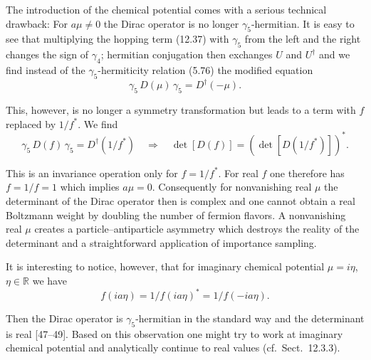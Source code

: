 The introduction of the chemical potential comes with a serious technical
drawback: For $a\mu \ne 0$ the Dirac operator is no longer
$\gamma_5$-hermitian. It is easy to see that multiplying the hopping term
(12.37) with $\gamma_5$ from the left and the right changes the sign of
$\gamma_4$; hermitian conjugation then exchanges $U$ and $U^\dagger$ and we
find instead of the $\gamma_5$-hermiticity relation (5.76) the modified
equation
\begin{equation}
  \gamma_5\,D(\mu)\,\gamma_5 = D^\dagger(-\mu).
\end{equation}

This, however, is no longer a symmetry transformation but leads to a term with
$f$ replaced by $1/f^*$. We find
\begin{equation}
  \gamma_5\,D(f)\,\gamma_5 = D^\dagger(1/f^*)
  \quad\Rightarrow\quad
  \det[D(f)] = \left(\det[D(1/f^*)]\right)^* .
\end{equation}

This is an invariance operation only for $f = 1/f^*$. For real $f$ one
therefore has $f = 1/f = 1$ which implies $a\mu = 0$. Consequently for
nonvanishing real $\mu$ the determinant of the Dirac operator then is complex
and one cannot obtain a real Boltzmann weight by doubling the number of fermion
flavors. A nonvanishing real $\mu$ creates a particle--antiparticle asymmetry
which destroys the reality of the determinant and a straightforward application
of importance sampling.

It is interesting to notice, however, that for imaginary chemical potential
$\mu = i\eta$, $\eta \in \mathbb{R}$ we have
\begin{equation}
  f(ia\eta) = 1/f(ia\eta)^* = 1/f(-ia\eta).
\end{equation}

Then the Dirac operator is $\gamma_5$-hermitian in the standard way and the
determinant is real [47--49]. Based on this observation one might try to work
at imaginary chemical potential and analytically continue to real values
(cf.\ Sect.~12.3.3).

